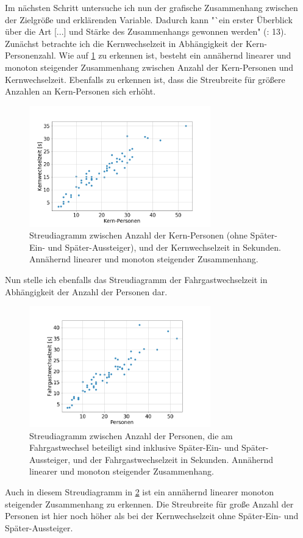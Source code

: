 Im nächsten Schritt untersuche ich nun der grafische Zusammenhang zwischen der Zielgröße und erklärenden Variable. Dadurch kann "`ein erster Überblick über die Art [...] und Stärke des Zusammenhangs gewonnen werden" (\cite{Fahrmeir.2009}: 13). \\
Zunächst betrachte ich die Kernwechselzeit in Abhängigkeit der Kern-Personenzahl. Wie auf \figurename \ref{fig:zusammenhangsAnalyse} zu erkennen ist, besteht ein annähernd linearer und monoton steigender Zusammenhang zwischen Anzahl der Kern-Personen und Kernwechselzeit. Ebenfalls zu erkennen ist, dass die Streubreite für größere Anzahlen an Kern-Personen sich erhöht.
\begin{figure}[H]
	\centering
		\includegraphics[width=0.7\textwidth]{pictures/data_evaluation/transferTime/core_coherence_analysis.png}
	\caption{Streudiagramm zwischen Anzahl der Kern-Personen (ohne Später-Ein- und Später-Aussteiger), und der Kernwechselzeit in Sekunden. Annähernd linearer und monoton steigender Zusammenhang.}
	\label{fig:zusammenhangsAnalyse}
\end{figure}
Nun stelle ich ebenfalls das Streudiagramm der Fahrgastwechselzeit in Abhängigkeit der Anzahl der Personen dar.
\begin{figure}[H]
	\centering
		\includegraphics[width=0.7\textwidth]{pictures/data_evaluation/transferTime/coherence_analysis.png}
	\caption{Streudiagramm zwischen Anzahl der Personen, die am Fahrgastwechsel beteiligt sind inklusive Später-Ein- und Später-Aussteiger, und der Fahrgastwechselzeit in Sekunden. Annähernd linearer und monoton steigender Zusammenhang.}
	\label{fig:zusammenhangsAnalyseAlle}
\end{figure}
Auch in diesem Streudiagramm in \figurename \ref{fig:zusammenhangsAnalyseAlle} ist ein annähernd linearer monoton steigender Zusammenhang zu erkennen. Die Streubreite für große Anzahl der Personen ist hier noch höher als bei der Kernwechselzeit ohne Später-Ein- und Später-Aussteiger. 

